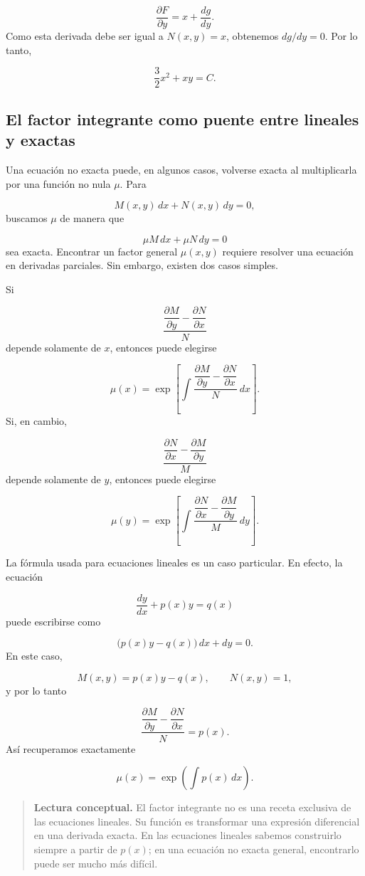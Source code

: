 \documentclass[12pt,a4paper]{article}
\begin{document}
	\[
	\frac{\partial F}{\partial y}=x+\frac{dg}{dy}.
	\]
	Como esta derivada debe ser igual a \(N(x,y)=x\), obtenemos \(dg/dy=0\). Por lo tanto,

	\[
	\boxed{\frac32x^2+xy=C.}
	\]

	\clearpage
	\subsection{El factor integrante como puente entre lineales y exactas}

	Una ecuación no exacta puede, en algunos casos, volverse exacta al multiplicarla por una función no nula \(\mu\). Para

	\[
	M(x,y)\,dx+N(x,y)\,dy=0,
	\]
	buscamos \(\mu\) de manera que

	\[
	\mu M\,dx+\mu N\,dy=0
	\]
	sea exacta. Encontrar un factor general \(\mu(x,y)\) requiere resolver una ecuación en derivadas parciales. Sin embargo, existen dos casos simples.

	Si

	\[
	\frac{\dfrac{\partial M}{\partial y}-\dfrac{\partial N}{\partial x}}{N}
	\]
	depende solamente de \(x\), entonces puede elegirse

	\[
	\boxed{
	\mu(x)
	=
	\exp\left[
	\int
	\frac{\dfrac{\partial M}{\partial y}-\dfrac{\partial N}{\partial x}}{N}
	\,dx
	\right].
	}
	\]
	Si, en cambio,

	\[
	\frac{\dfrac{\partial N}{\partial x}-\dfrac{\partial M}{\partial y}}{M}
	\]
	depende solamente de \(y\), entonces puede elegirse

	\[
	\boxed{
	\mu(y)
	=
	\exp\left[
	\int
	\frac{\dfrac{\partial N}{\partial x}-\dfrac{\partial M}{\partial y}}{M}
	\,dy
	\right].
	}
	\]

	La fórmula usada para ecuaciones lineales es un caso particular. En efecto, la ecuación

	\[
	\frac{dy}{dx}+p(x)y=q(x)
	\]
	puede escribirse como

	\[
	\bigl(p(x)y-q(x)\bigr)\,dx+dy=0.
	\]
	En este caso,

	\[
	M(x,y)=p(x)y-q(x),
	\qquad
	N(x,y)=1,
	\]
	y por lo tanto

	\[
	\frac{\dfrac{\partial M}{\partial y}-\dfrac{\partial N}{\partial x}}{N}
	=
	p(x).
	\]
	Así recuperamos exactamente

	\[
	\mu(x)=\exp\left(\int p(x)\,dx\right).
	\]

	\begin{quote}
		\textbf{Lectura conceptual.} El factor integrante no es una receta exclusiva de las ecuaciones lineales. Su función es transformar una expresión diferencial en una derivada exacta. En las ecuaciones lineales sabemos construirlo siempre a partir de \(p(x)\); en una ecuación no exacta general, encontrarlo puede ser mucho más difícil.
	\end{quote}
\end{document}
